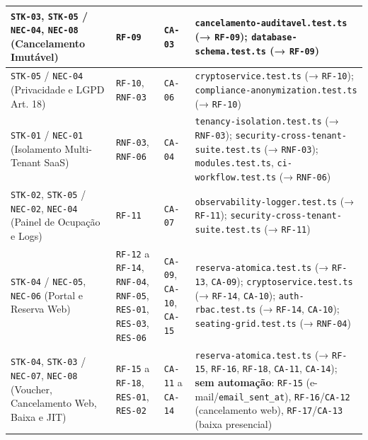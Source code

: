 {\begin{xltabular}{\textwidth}{>{\hsize\sloppy\arraybackslash}X >{\hsize\centering\arraybackslash}X >{\hsize\centering\arraybackslash}X >{\hsize\sloppy\arraybackslash}X}
\midrule
\texttt{STK-03}, \texttt{STK-05} / \texttt{NEC-04}, \texttt{NEC-08} (Cancelamento Imutável) & \texttt{RF-09} & \texttt{CA-03} & \texttt{cancelamento-\allowbreak{}auditavel.\allowbreak{}test.\allowbreak{}ts} (→ \texttt{RF-09}); \texttt{database-\allowbreak{}schema.\allowbreak{}test.\allowbreak{}ts} (→ \texttt{RF-09}) \\
\midrule
\texttt{STK-05} / \texttt{NEC-04} (Privacidade e LGPD Art. 18) & \texttt{RF-10}, \texttt{RNF-03} & \texttt{CA-06} & \texttt{cryptoservice.\allowbreak{}test.\allowbreak{}ts} (→ \texttt{RF-10}); \texttt{compliance-\allowbreak{}anonymization.\allowbreak{}test.\allowbreak{}ts} (→ \texttt{RF-10}) \\
\midrule
\texttt{STK-01} / \texttt{NEC-01} (Isolamento Multi-Tenant SaaS) & \texttt{RNF-03}, \texttt{RNF-06} & \texttt{CA-04} & \texttt{tenancy-\allowbreak{}isolation.\allowbreak{}test.\allowbreak{}ts} (→ \texttt{RNF-03}); \texttt{security-\allowbreak{}cross-\allowbreak{}tenant-\allowbreak{}suite.\allowbreak{}test.\allowbreak{}ts} (→ \texttt{RNF-03}); \texttt{modules.test.ts}, \texttt{ci-\allowbreak{}workflow.\allowbreak{}test.\allowbreak{}ts} (→ \texttt{RNF-06}) \\
\midrule
\texttt{STK-02}, \texttt{STK-05} / \texttt{NEC-02}, \texttt{NEC-04} (Painel de Ocupação e Logs) & \texttt{RF-11} & \texttt{CA-07} & \texttt{observability-\allowbreak{}logger.\allowbreak{}test.\allowbreak{}ts} (→ \texttt{RF-11}); \texttt{security-\allowbreak{}cross-\allowbreak{}tenant-\allowbreak{}suite.\allowbreak{}test.\allowbreak{}ts} (→ \texttt{RF-11}) \\
\midrule
\texttt{STK-04} / \texttt{NEC-05}, \texttt{NEC-06} (Portal e Reserva Web) & \texttt{RF-12} a \texttt{RF-14}, \texttt{RNF-04}, \texttt{RNF-05}, \texttt{RES-01}, \texttt{RES-03}, \texttt{RES-06} & \texttt{CA-09}, \texttt{CA-10}, \texttt{CA-15} & \texttt{reserva-\allowbreak{}atomica.\allowbreak{}test.\allowbreak{}ts} (→ \texttt{RF-13}, \texttt{CA-09}); \texttt{cryptoservice.\allowbreak{}test.\allowbreak{}ts} (→ \texttt{RF-14}, \texttt{CA-10}); \texttt{auth-\allowbreak{}rbac.\allowbreak{}test.\allowbreak{}ts} (→ \texttt{RF-14}, \texttt{CA-10}); \texttt{seating-\allowbreak{}grid.\allowbreak{}test.\allowbreak{}ts} (→ \texttt{RNF-04}) \\
\midrule
\texttt{STK-04}, \texttt{STK-03} / \texttt{NEC-07}, \texttt{NEC-08} (Voucher, Cancelamento Web, Baixa e JIT) & \texttt{RF-15} a \texttt{RF-18}, \texttt{RES-01}, \texttt{RES-02} & \texttt{CA-11} a \texttt{CA-14} & \texttt{reserva-\allowbreak{}atomica.\allowbreak{}test.\allowbreak{}ts} (→ \texttt{RF-15}, \texttt{RF-16}, \texttt{RF-18}, \texttt{CA-11}, \texttt{CA-14}); \textbf{sem automação}: \texttt{RF-15} (e-mail/\texttt{email\_\allowbreak{}sent\_\allowbreak{}at}), \texttt{RF-16}/\texttt{CA-12} (cancelamento web), \texttt{RF-17}/\texttt{CA-13} (baixa presencial) \\
\end{xltabular}%
}
